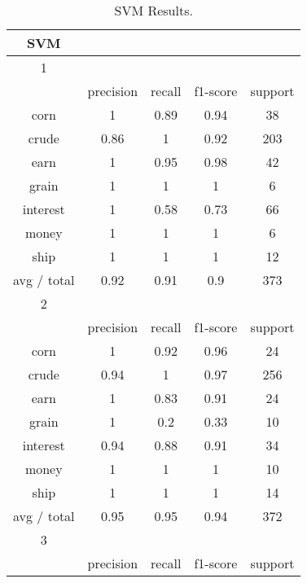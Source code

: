 \documentclass[11pt]{article}
\begin{document}
\begin{center}
\begin{longtable}{| c | c | c | c | c |}
\caption{SVM Results.} \\
\hline
SVM         &           &        &          &         \\
\hline
1           &           &        &          &         \\
\hline
           & precision & recall & f1-score & support \\

corn        & 1         & 0.89   & 0.94     & 38      \\
crude       & 0.86      & 1      & 0.92     & 203     \\
earn        & 1         & 0.95   & 0.98     & 42      \\
grain       & 1         & 1      & 1        & 6       \\
interest    & 1         & 0.58   & 0.73     & 66      \\
money       & 1         & 1      & 1        & 6       \\
ship        & 1         & 1      & 1        & 12      \\

avg / total & 0.92      & 0.91   & 0.9      & 373     \\

\hline
2           &           &        &          &         \\
\hline
           & precision & recall & f1-score & support \\

corn        & 1         & 0.92   & 0.96     & 24      \\
crude       & 0.94      & 1      & 0.97     & 256     \\
earn        & 1         & 0.83   & 0.91     & 24      \\
grain       & 1         & 0.2    & 0.33     & 10      \\
interest    & 0.94      & 0.88   & 0.91     & 34      \\
money       & 1         & 1      & 1        & 10      \\
ship        & 1         & 1      & 1        & 14      \\

avg / total & 0.95      & 0.95   & 0.94     & 372     \\

\hline
3           &           &        &          &         \\
\hline
           & precision & recall & f1-score & support \\


\end{longtable}
\end{center}
\end{document}
